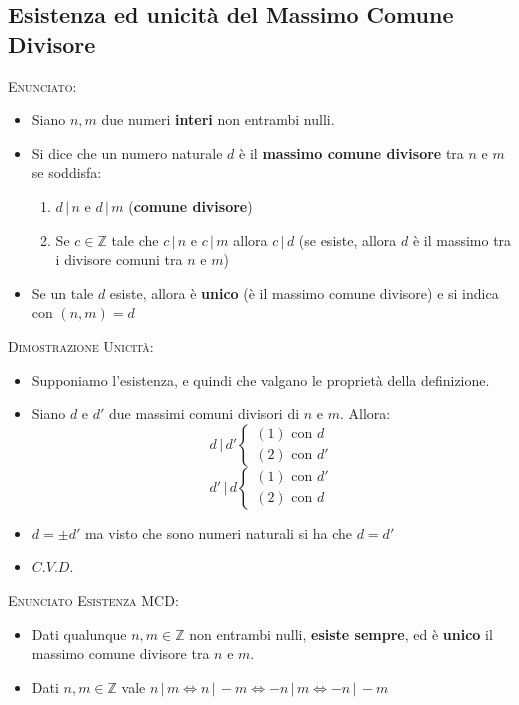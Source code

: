 \documentclass[10pt]{article}
\begin{document}
\subsection{Esistenza ed unicità del Massimo Comune Divisore}
\textsc{Enunciato:}
\begin{itemize}
\item
Siano $n,m$ due numeri \textbf{interi} non entrambi nulli. 
\item
Si dice che un numero naturale $d$ è il \textbf{massimo comune divisore} tra $n$ e $m$ se soddisfa:
\begin{enumerate}
\item
$d \,|\, n$ e $d \,|\, m$ (\textbf{comune divisore})
\item
Se $c \in \mathbb{Z}$ tale che $c \,|\, n$ e $c \,|\, m$ allora $c \,|\, d$ (se esiste, allora $d$ è il massimo tra i divisore comuni tra $n$ e $m$)
\end{enumerate}
\item
Se un tale $d$ esiste, allora è \textbf{unico} (è il massimo comune divisore) e si indica con $(n,m) = d$
\end{itemize}
\textsc{Dimostrazione Unicità:}
\begin{itemize}
\item
Supponiamo l'esistenza, e quindi che valgano le proprietà della definizione.
\item
Siano $d$ e $d'$ due massimi comuni divisori di $n$ e $m$. Allora:
\[
d \,|\, d'
\begin{cases}
(1) \textrm{ con } d \\
(2) \textrm{ con } d'
\end{cases}
\]
\[
d' \,|\, d
\begin{cases}
(1) \textrm{ con } d'\\
(2) \textrm{ con } d
\end{cases}
\]
\item
$d=\pm d'$ ma visto che sono numeri naturali si ha che $d = d'$
\item
$C.V.D.$
\end{itemize}
\newpage
\textsc{Enunciato Esistenza MCD:}
\begin{itemize}
\item
Dati qualunque $n,m \in \mathbb{Z}$ non entrambi nulli, \textbf{esiste sempre}, ed è \textbf{unico} il massimo comune divisore tra $n$ e $m$.
\item
Dati $n,m \in \mathbb{Z}$ vale $n \,|\, m \Longleftrightarrow n \,|\, -m \Longleftrightarrow -n \,|\, m \Longleftrightarrow -n \,|\, -m$
\end{itemize}
\end{document}
